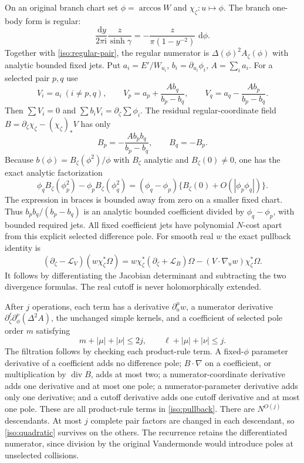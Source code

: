 \documentclass[11pt]{article}
\numberwithin{equation}{section}
\theoremstyle{definition}
\newcommand{\ii}{\mathrm i}
\newcommand{\dd}{\,\mathrm d}
\begin{document}
On an original branch chart set $\phi=\arccos W$ and
$\chi_\zeta:u\mapsto\phi$. The branch one-body form is regular:
\[
 \frac{\dd y}{2\pi\ii}\frac{z}{\sinh\gamma}
 =-\frac{z}{\pi(1-y^{-2})}\,\dd\phi.
\]
Together with \eqref{iso:regular-pair}, the regular numerator is
$\Delta(\phi)^2A_\zeta(\phi)$ with analytic bounded fixed jets.
Put $a_i=E'/W_{u_i}$, $b_i=\partial_{u_i}\phi_i$, $A=\sum_i a_i$.
For a selected pair $p,q$ use
\[
 V_i=a_i\ (i\ne p,q),\qquad
 V_p=a_p+\frac{Ab_q}{b_p-b_q},\qquad
 V_q=a_q-\frac{Ab_p}{b_p-b_q}.
\]
Then $\sum V_i=0$ and $\sum b_iV_i=\partial_\zeta\sum\phi_i$.
The residual regular-coordinate field
$B=\partial_\zeta\chi_\zeta-(\chi_\zeta)_*V$ has only
\[
 B_p=-\frac{Ab_pb_q}{b_p-b_q},\qquad B_q=-B_p.
\]
Because $b(\phi)=B_\zeta(\phi^2)/\phi$ with $B_\zeta$ analytic
and $B_\zeta(0)\ne0$, one has the exact analytic factorization
\[
 \phi_qB_\zeta(\phi_p^2)-\phi_pB_\zeta(\phi_q^2)
 =(\phi_q-\phi_p)
       \{B_\zeta(0)+O(|\phi_p\phi_q|)\}.
\]
The expression in braces is bounded away from zero on a smaller fixed
chart. Thus $b_pb_q/(b_p-b_q)$ is an analytic bounded coefficient
divided by $\phi_q-\phi_p$, with bounded required jets.
All fixed coefficient jets have polynomial
$N$-cost apart from this explicit selected difference pole.
For smooth real $w$ the exact pullback identity is
\begin{equation}
 (\partial_\zeta-\mathcal L_V)(w\chi_\zeta^*\Omega)
 =w\chi_\zeta^*(\partial_\zeta+\mathcal L_B)\Omega
 -(V\cdot\nabla_u w)\chi_\zeta^*\Omega.
 \label{iso:pullback}
\end{equation}
It follows by differentiating the Jacobian determinant and subtracting
the two divergence formulas. The real cutoff is never holomorphically
extended.

After $j$ operations, each term has a derivative
$\partial_u^\mu w$, a numerator derivative
$\partial_\zeta^\ell\partial_\phi^\nu(\Delta^2A)$, the unchanged
simple kernels, and a coefficient of selected pole order $m$ satisfying
\begin{equation}
 m+|\mu|+|\nu|\le2j,\qquad
 \ell+|\mu|+|\nu|\le j.
 \label{iso:filtration}
\end{equation}
The filtration follows by checking each product-rule term. A
fixed-$\phi$ parameter derivative of a coefficient adds no difference pole; $B\cdot\nabla$ on a coefficient,
or multiplication by $\operatorname{div}B$, adds at most two; a
numerator-coordinate derivative adds one derivative and at most one
pole; a numerator-parameter derivative adds only one derivative; and a
cutoff derivative adds one cutoff derivative and at most one pole.
These are all product-rule terms in \eqref{iso:pullback}.
There are $N^{O(j)}$ descendants. At most $j$ complete pair factors are
changed in each descendant, so \eqref{iso:quadratic} survives on the
others. The recurrence retains the differentiated numerator, since
division by the original Vandermonde would introduce poles at
unselected collisions.
\end{document}
